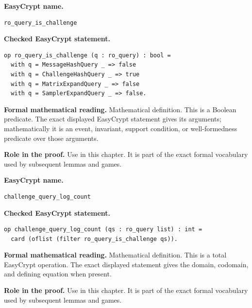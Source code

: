 \begin{formaldefinition}
\noindent\textbf{EasyCrypt name.}
\begin{lstlisting}[language=EasyCrypt,basicstyle=\ttfamily\scriptsize]
ro_query_is_challenge
\end{lstlisting}
\noindent\textbf{Checked EasyCrypt statement.}
\begin{lstlisting}[language=EasyCrypt,basicstyle=\ttfamily\scriptsize]
op ro_query_is_challenge (q : ro_query) : bool =
  with q = MessageHashQuery _ => false
  with q = ChallengeHashQuery _ => true
  with q = MatrixExpandQuery _ => false
  with q = SamplerExpandQuery _ => false.
\end{lstlisting}
\noindent\textbf{Formal mathematical reading.}
Mathematical definition. This is a Boolean predicate.  The exact displayed EasyCrypt statement gives its arguments; mathematically it is an event, invariant, support condition, or well-formedness predicate over those arguments.

\noindent\textbf{Role in the proof.}
Use in this chapter. It is part of the exact formal vocabulary used by subsequent lemmas and games.

\end{formaldefinition}

\begin{formaldefinition}
\noindent\textbf{EasyCrypt name.}
\begin{lstlisting}[language=EasyCrypt,basicstyle=\ttfamily\scriptsize]
challenge_query_log_count
\end{lstlisting}
\noindent\textbf{Checked EasyCrypt statement.}
\begin{lstlisting}[language=EasyCrypt,basicstyle=\ttfamily\scriptsize]
op challenge_query_log_count (qs : ro_query list) : int =
  card (oflist (filter ro_query_is_challenge qs)).
\end{lstlisting}
\noindent\textbf{Formal mathematical reading.}
Mathematical definition. This is a total EasyCrypt operation.  The exact displayed statement gives the domain, codomain, and defining equation when present.

\noindent\textbf{Role in the proof.}
Use in this chapter. It is part of the exact formal vocabulary used by subsequent lemmas and games.

\end{formaldefinition}

